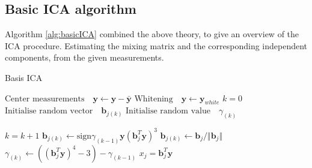\subsection{Basic ICA algorithm} 
Algorithm \ref{alg:basicICA} combined the above theory, to give an overview of the ICA procedure. Estimating the mixing matrix and the corresponding independent components, from the given measurements. 
\begin{algorithm}[H]
\caption{Basis ICA}
\begin{algorithmic}[1]
			\State $\text{Center measurements} \quad \textbf{y} \gets \textbf{y} - \bar{\textbf{y}}$
			\State $\text{Whitening} \quad \textbf{y}\gets \textbf{y}_{white}$ 
			\EndProcedure  
			\State
			\State$k=0$            
            \State$\text{Initialise random vector} \quad \textbf{b}_{j(k)}$ 
            \State$\text{Initialise random value} \quad \gamma_{(k)}$
            
               		\State $k = k+1$
                	\State $\textbf{b}_{j(k)} \gets \text{sign}\gamma_{(k-1)} \textbf{y}(\textbf{b}_{j}^T \textbf{y})^3$
                	\State $\textbf{b}_{j(k)} \gets \textbf{b}_j/\Vert \textbf{b}_j \Vert $ 
                	\State $\gamma_{(k)} \gets ((\textbf{b}_{j}^T \textbf{y})^4 - 3) - \gamma_{(k-1)} $
          		\EndWhile
          		\State $x_{j} = \textbf{b}_{j}^T\textbf{y}$
          	\EndFor
          	
            \EndProcedure
        \end{algorithmic} 
        \label{alg:basicICA}
\end{algorithm}


